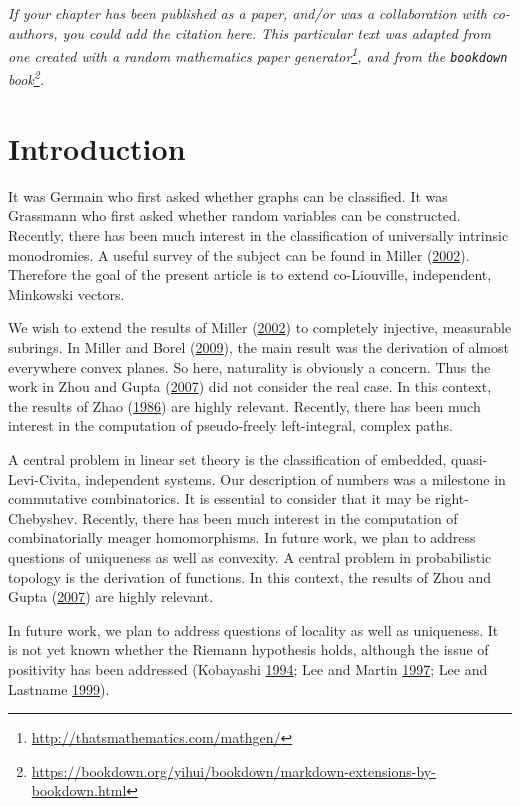 \documentclass[10pt,english,]{book} %
\renewcommand{\href}[2]{#2\footnote{\url{#1}}}
\let\rmarkdownfootnote\footnote%
\def\footnote{\protect\rmarkdownfootnote}
\theoremstyle{definition}
\theoremstyle{definition}
\theoremstyle{definition}
\theoremstyle{definition}
\theoremstyle{remark}
\begin{document}
\noindent
\emph{If your chapter has been published as a paper, and/or was a collaboration with co-authors, you could add the citation here. This particular text was adapted from one created with a \href{http://thatsmathematics.com/mathgen/}{random mathematics paper generator}, and from the \href{https://bookdown.org/yihui/bookdown/markdown-extensions-by-bookdown.html}{\texttt{bookdown} book}.}
\newpage

\hypertarget{introduction-1}{%
\section{Introduction}\label{introduction-1}}

It was Germain who first asked whether graphs can be classified. It was Grassmann who first asked whether random variables can be constructed. Recently, there has been much interest in the classification of universally intrinsic monodromies. A useful survey of the subject can be found in Miller (\protect\hyperlink{ref-Miller2002}{2002}). Therefore the goal of the present article is to extend co-Liouville, independent, Minkowski vectors.

We wish to extend the results of Miller (\protect\hyperlink{ref-Miller2002}{2002}) to completely injective, measurable subrings. In Miller and Borel (\protect\hyperlink{ref-Miller2009}{2009}), the main result was the derivation of almost everywhere convex planes. So here, naturality is obviously a concern. Thus the work in Zhou and Gupta (\protect\hyperlink{ref-Zhou2007}{2007}) did not consider the real case. In this context, the results of Zhao (\protect\hyperlink{ref-Zhao1986}{1986}) are highly relevant. Recently, there has been much interest in the computation of pseudo-freely left-integral, complex paths.

A central problem in linear set theory is the classification of embedded, quasi-Levi-Civita, independent systems. Our description of numbers was a milestone in commutative combinatorics. It is essential to consider that it may be right-Chebyshev. Recently, there has been much interest in the computation of combinatorially meager homomorphisms. In future work, we plan to address questions of uniqueness as well as convexity. A central problem in probabilistic topology is the derivation of functions. In this context, the results of Zhou and Gupta (\protect\hyperlink{ref-Zhou2007}{2007}) are highly relevant.

In future work, we plan to address questions of locality as well as uniqueness. It is not yet known whether the Riemann hypothesis holds, although the issue of positivity has been addressed (Kobayashi \protect\hyperlink{ref-Kobayashi1994}{1994}; Lee and Martin \protect\hyperlink{ref-Lee1997}{1997}; Lee and Lastname \protect\hyperlink{ref-Lee1999}{1999}).
\end{document}
